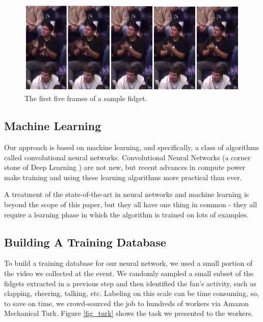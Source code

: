 \documentclass[times, 10pt,twocolumn]{article}
\begin{document}
\begin{figure}[bt]
\centering
\includegraphics[width=0.96\columnwidth]{fidget}
\caption{\label{fig_fidget} \small The first five frames of a sample fidget. }
\end{figure}

\subsection{Machine Learning}
\label{sec_machinelearning}

Our approach is based on machine learning, and specifically, a class of algorithms called convolutional neural networks.  Convolutional Neural Networks (a corner stone of Deep Learning \cite{deeplearning}) are not new, but recent advances in compute power make training and using these learning algorithms more practical than ever.

A treatment of the state-of-the-art in neural networks and machine learning is beyond the scope of this paper, but they all have one thing in common - they all require a learning phase in which the algorithm is trained on lots of examples.  

\subsection{Building A Training Database}
\label{sec_traindb}

To build a training database for our neural network, we used a small portion of the video we collected at the event.  We randomly sampled a small subset of the fidgets extracted in a previous step and then identified the fan's activity, such as clapping, cheering, talking, etc.  Labeling on this scale can be time consuming, so, to save on time, we crowd-sourced the job to hundreds of workers via Amazon Mechanical Turk.  Figure \ref{fig_turk} shows the task we presented to the workers.  
\end{document}
